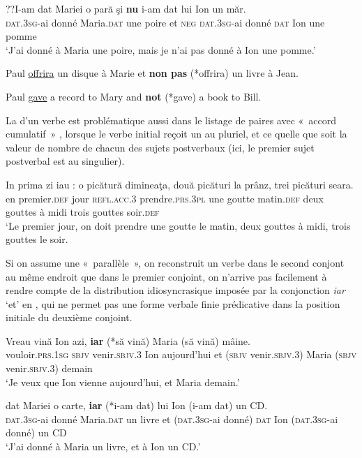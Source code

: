 \ex 
\gll ??I-am  dat  Mariei  o  pară  şi  \textbf{nu}  i-am  dat  lui  Ion  un măr. \label{ch2:ex288b}\\
\textsc{dat.3sg}{}-ai donné  Maria.\textsc{dat}  une  poire  et \textsc{neg} \textsc{dat.3sg}{}-ai donné \textsc{dat}  Ion  une pomme\\
\glt ‘J’ai donné à Maria une poire, mais je n’ai pas donné à Ion une pomme.’
\z
\z


\ea \label{ch2:ex289}
Paul \uline{offrira} un disque à Marie et \textbf{non pas} (*offrira) un livre à Jean. 
\z

\ea \label{ch2:ex290}
Paul \uline{gave} a record to Mary and \textbf{not} (*gave) a book to Bill.
\z

La  d’un verbe est problématique aussi dans le listage de paires avec «~accord cumulatif~» , lorsque le verbe initial reçoit un  au pluriel, et ce quelle que soit la valeur de nombre de chacun des sujets postverbaux (ici, le premier sujet postverbal est au singulier). 

\ea \label{ch2:ex291}
\gll In  prima  zi   {iau :}  o  picătură dimineaţa,  două picături  la  prânz,  trei  picături  seara.\\ 
en  premier.\textsc{def}  jour  \textsc{refl.acc.3} prendre.\textsc{prs.3pl}  une  goutte  matin.\textsc{def}  deux gouttes  à  midi  trois  gouttes  soir.\textsc{def}\\
\glt ‘Le premier jour, on doit prendre une goutte le matin, deux gouttes à midi, trois gouttes le soir.
\z

Si on assume une  «~parallèle~», {\cad} on reconstruit un verbe dans le second conjont au même endroit que dans le premier conjoint, on n’arrive pas facilement à rendre compte de la distribution idiosyncrasique imposée par la conjonction \textit{iar} ‘et’ en , qui ne permet pas une forme verbale finie prédicative dans la position initiale du deuxième conjoint.

\ea \label{ch2:ex292}
\ea 
\gll Vreau    vină  Ion  azi,  \textbf{iar}  (*să  vină)  Maria (să  vină)  mâine.\\
vouloir.\textsc{prs.1sg}  \textsc{sbjv}  venir.\textsc{sbjv.3}  Ion  aujourd’hui  et  (\textsc{sbjv}  venir.\textsc{sbjv.3})  Maria (\textsc{sbjv}  venir.\textsc{sbjv.3)} demain\\
\glt ‘Je veux que Ion vienne aujourd’hui, et Maria demain.’

\ex 
\gll {}  dat  Mariei  o  carte,  \textbf{iar}  (*i-am  dat)  lui  Ion (i-am  dat)  un  CD.\\
\textsc{dat.3sg}{}-ai  donné  Maria.\textsc{dat}  un  livre  et  (\textsc{dat.3sg}{}-ai  donné)  \textsc{dat}  Ion (\textsc{dat.3sg}{}-ai  donné)  un  CD\\
\glt ‘J’ai donné à Maria un livre, et à Ion un CD.’
\z
\z

